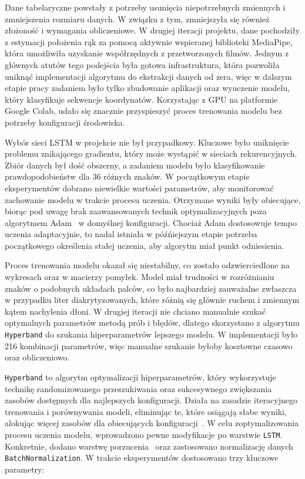 Dane tabelaryczne powstały z potrzeby usunięcia niepotrzebnych zmiennych i zmniejszenia rozmiaru danych. W związku z tym, zmniejszyła się również złożoność i wymagania obliczeniowe. W drugiej iteracji projektu, dane pochodziły z estymacji położenia rąk za pomocą aktywnie wspieranej biblioteki MediaPipe, która umożliwiła uzyskanie współrzędnych z przetworzonych filmów. Jednym z głównych atutów tego podejścia była gotowa infrastruktura, która pozwoliła uniknąć implementacji algorytmu do ekstrakcji danych od zera, więc w dalszym etapie pracy zadaniem było tylko zbudowanie aplikacji oraz wyuczenie modelu, który klasyfikuje sekwencje koordynatów. Korzystając z GPU na platformie Google Colab, udało się znacznie przyspieszyć proces trenowania modelu bez potrzeby konfiguracji środowiska.

Wybór sieci LSTM w projekcie nie był przypadkowy. Kluczowe było uniknięcie problemu znikającego gradientu, który może wystąpić w sieciach rekurencyjnych. Zbiór danych był dość obszerny, a zadaniem modelu było klasyfikowanie prawdopodobieństw dla 36 różnych znaków. W początkowym etapie eksperymentów dobrano niewielkie wartości parametrów, aby monitorować zachowanie modelu w trakcie procesu uczenia. Otrzymane wyniki były obiecujące, biorąc pod uwagę brak zaawansowanych technik optymalizacyjnych poza algorytmem Adam~\cite{kingma2015} w domyślnej konfiguracji. Chociaż Adam dostosowuje tempo uczenia adaptacyjnie, to nadal istniała w późńiejszym etapie potrzeba początkowego określenia stałej uczenia, aby algorytm miał punkt odniesienia.

Proces trenowania modelu okazał się niestabilny, co zostało odzwierciedlone na wykresach oraz w macierzy pomyłek. Model miał trudności w rozróżnianiu znaków o podobnych układach palców, co było najbardziej zauważalne zwłaszcza w przypadku liter diakrytyzowanych, które różnią się głównie ruchem i zmiennym kątem nachylenia dłoni. W drugiej iteracji nie chciano manualnie szukać optymalnych parametrów metodą prób i błędów, dlatego skorzystano z algorytmu \texttt{Hyperband} do szukania hiperparametrów lepszego modelu. W implementacji było 216 kombinacji parametrów, więc manualne szukanie byłoby kosztowne czasowo oraz obliczeniowo.

\texttt{Hyperband} to algorytm optymalizacji hiperparametrów, który wykorzystuje technikę randomizowanego przeszukiwania oraz sukcesywnego zwiększania zasobów dostępnych dla najlepszych konfiguracji. Działa na zasadzie iteracyjnego trenowania i porównywania modeli, eliminując te, które osiągają słabe wyniki, alokując więcej zasobów dla obiecujących konfiguracji~\cite{li2017}. W celu zoptymalizowania procesu uczenia modelu, wprowadzono pewne modyfikacje po warstwie \texttt{LSTM}. Konkretnie, dodano warstwę porzucenia~\cite{hinton2012} oraz zastosowano normalizację danych \texttt{BatchNormalization}. W trakcie eksperymentów dostosowano trzy kluczowe parametry:

